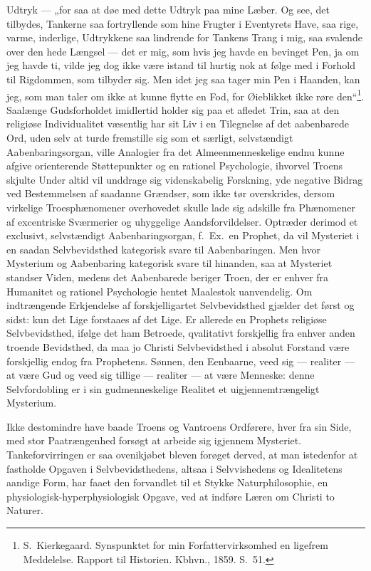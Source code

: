\documentclass[12pt]{book}
\begin{document}
Udtryk --- „for saa at døe med dette Udtryk paa mine Læber. Og see,
det tilbydes, Tankerne saa fortryllende som hine Frugter i
Eventyrets Have, saa rige, varme, inderlige, Udtrykkene saa lindrende
for Tankens Trang i mig, saa svalende over den hede Længsel --- det
er mig, som hvis jeg havde en bevinget Pen, ja om jeg havde ti, vilde
jeg dog ikke være istand til hurtig nok at følge med i Forhold til
Rigdommen, som tilbyder sig. Men idet jeg saa tager min Pen i
Haanden, kan jeg, som man taler om ikke at kunne flytte en Fod, for
Øieblikket ikke røre den“\footnote{S.\ Kierkegaard. Synspunktet for
min Forfattervirksomhed en ligefrem Meddelelse. Rapport til
Historien. Kbhvn., 1859. S.\ 51.}.
Saalænge Gudsforholdet imidlertid holder sig paa et afledet Trin, saa
at den religiøse Individualitet væsentlig har sit Liv i en Tilegnelse
af det aabenbarede Ord, uden selv at turde fremstille sig som et
særligt, selvstændigt Aabenbaringsorgan, ville Analogier fra det
Almeenmenneskelige endnu kunne afgive orienterende Støttepunkter og
en rationel Psychologie, ihvorvel Troens skjulte Under altid vil
unddrage sig videnskabelig Forskning, yde negative Bidrag ved
Bestemmelsen af saadanne Grændser, som ikke tør overskrides, dersom
virkelige Troesphænomener overhovedet skulle lade sig adskille fra
Phænomener af excentriske Sværmerier og uhyggelige
Aandsforvildelser. Optræder derimod et exclusivt, selvstændigt
Aabenbaringsorgan, f.\ Ex.\ en Prophet, da vil Mysteriet i en saadan
Selvbevidsthed kategorisk svare til Aabenbaringen. Men hvor Mysterium
og Aabenbaring kategorisk svare til hinanden, saa at Mysteriet
standser Viden, medens det Aabenbarede beriger Troen, der er enhver
fra Humanitet og rationel Psychologie hentet Maalestok uanvendelig.
Om indtrængende Erkjendelse af forskjelligartet Selvbevidsthed
gjælder det først og sidst: kun det Lige forstaaes af det Lige. Er
allerede en Prophets religiøse Selvbevidsthed, ifølge det ham
Betroede, qvalitativt forskjellig fra enhver anden troende
Bevidsthed, da maa jo Christi Selvbevidsthed i absolut Forstand være
forskjellig endog fra Prophetens. Sønnen, den Eenbaarne, veed sig ---
realiter --- at være Gud og veed sig tillige --- realiter --- at være
Menneske: denne Selvfordobling er i sin gudmenneskelige Realitet et
uigjennemtrængeligt Mysterium.

Ikke destomindre have baade Troens og Vantroens Ordførere, hver fra
sin Side, med stor Paatrængenhed forsøgt at arbeide sig igjennem
Mysteriet. Tankeforvirringen er saa ovenikjøbet bleven forøget
derved, at man istedenfor at fastholde Opgaven i Selvbevidsthedens,
altsaa i Selvvishedens og Idealitetens aandige Form, har faaet den
forvandlet til et Stykke Naturphilosophie, en
physiologisk-hyperphysiologisk Opgave, ved at indføre Læren om
Christi to Naturer.
\end{document}

